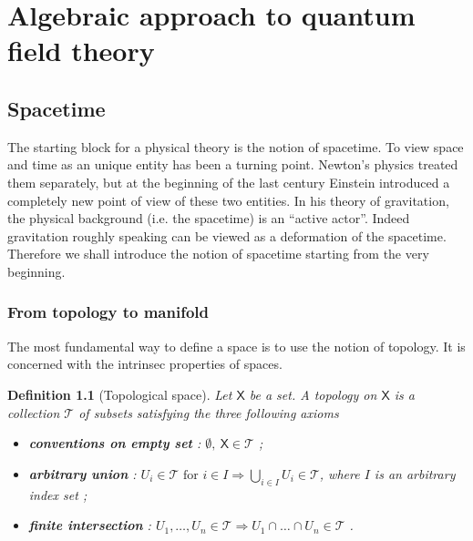 \documentclass[11pt]{book}
\newcommand{\Tcal}{\mathcal{T}}
\newcommand{\Xsf}{\mathsf{X}}
\theoremstyle{break}
\newtheorem{definition}{Definition}
\begin{document}


\part{Algebraic approach to quantum field theory}

\chapter{Spacetime}



The starting block for a physical theory is the notion of spacetime. To view space and time as an unique entity has been a turning point. Newton's physics treated them separately, but at the beginning of the last century Einstein introduced a completely new point of view of these two entities. In his theory of gravitation, the physical background (i.e. the spacetime) is an ``active actor''. Indeed gravitation roughly speaking can be viewed as a deformation of the spacetime. Therefore we shall introduce the notion of spacetime starting from the very beginning.


\section{From topology to manifold}

The most fundamental way to define a space is to use the notion of topology. It is concerned with the intrinsec properties of spaces.


\begin{definition}[Topological space] 
Let $\Xsf$ be a set. A topology on $\Xsf$ is a collection $\Tcal$ of subsets satisfying the three following axioms%
%
\begin{itemize}
\item \textbf{conventions on empty set} : $\emptyset , \ \Xsf \in \Tcal$ ;
\item \textbf{arbitrary union} : $U_i \in \Tcal \mbox{ for } i \in I \Longrightarrow \bigcup_{i\in I} U_i \in \Tcal$, where $I$ is an arbitrary index set ;
\item \textbf{finite intersection} : $U_1 , \dots , U_n \in \Tcal \Longrightarrow U_1 \cap \dots \cap U_n \in \Tcal$ .
\end{itemize}
%
\end{definition}
\end{document}
